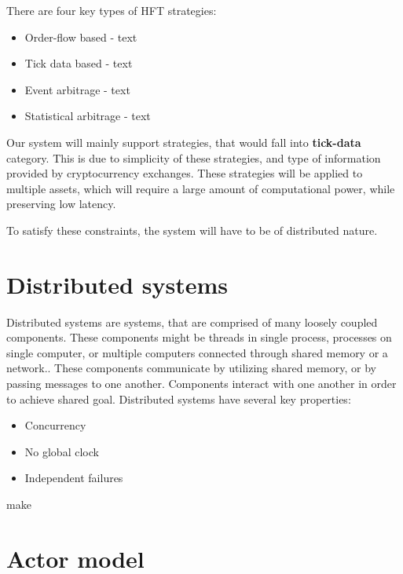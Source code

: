 There are four key types of HFT strategies:
\begin{itemize}
    \item {Order-flow based - text }
    \item {Tick data based - text }
    \item {Event arbitrage - text}
    \item {Statistical arbitrage - text }
\end{itemize}



Our system will mainly support strategies, that would fall into \textbf{tick-data} category. This is due
to simplicity of these strategies, and type of information provided by cryptocurrency exchanges. These strategies will be
applied to multiple assets, which will require a large amount of computational power, while preserving low latency.

To satisfy these constraints, the system will have to be of distributed nature.


\section{Distributed systems}
Distributed systems are systems, that are comprised of many loosely coupled components. These components might be threads
in single process, processes on single computer, or multiple computers connected through shared memory or a network..
These components communicate by utilizing shared memory, or by passing messages to one another. Components interact with
one another in order to achieve shared goal. Distributed systems have several key properties:

\begin{itemize}
    \item Concurrency
    \item No global clock
    \item Independent failures
\end{itemize}
make

\section{Actor model}
